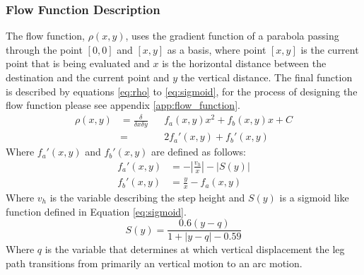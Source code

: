         \subsubsection{Flow Function Description} \label{sec:flow_function}
            The flow function, \(\rho(x,y)\), uses the gradient function of a parabola passing through the point \([0,0]\) and \([x,y]\) as a basis, where point \([x,y]\)
            is the current point that is being evaluated and \(x\) is the horizontal distance between the destination and the current point and \(y\) the
            vertical distance. The final function is described by equations \ref{eq:rho} to \ref{eq:sigmoid}, for the process of designing the flow function
            please see appendix \ref{app:flow_function}.
            \begin{equation} \label{eq:rho}
                \begin{aligned}
                    \rho(x,y) &= \frac{\delta}{\delta x\delta y}&&f_a(x,y)x^2 + f_b(x,y)x + C\\
                    &= &&2f_a'(x,y) + f_b'(x,y)    
                \end{aligned}
            \end{equation}
            Where \(f_a'(x,y)\) and \(f_b'(x,y)\) are defined as follows:
            \begin{align} \label{eq:fa}
                f_a'(x,y) &= -\left|\frac{v_h}{x}\right| - \left|S(y)\right|\\
                f_b'(x,y) &= \frac{y}{x} - f_a(x,y)
            \end{align}
            Where \(v_h\) is the variable describing the step height and \(S(y)\) is a sigmoid like function defined in Equation \ref{eq:sigmoid}.
            \begin{equation} \label{eq:sigmoid}
                S(y) = \frac{0.6(y-q)}{1+\left|y-q\right|-0.59}
            \end{equation}
            Where \(q\) is the variable that determines at which vertical displacement the leg path transitions from primarily an vertical motion to
            an arc motion.






